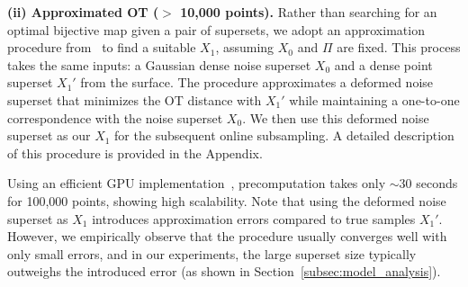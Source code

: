 \textbf{(ii) Approximated OT ($>$ 10,000 points).
}
Rather than searching for an optimal bijective map given a pair of supersets, we adopt an approximation procedure from~\cite{feydy2020geometric} to find a suitable $X_1$, assuming $X_0$ and $\Pi$ are fixed.
This process takes the same inputs: a Gaussian dense noise superset $X_0$ and a dense point superset $X_1'$ from the surface.
%
The procedure approximates a deformed noise superset that minimizes the OT distance with $X_1'$ while maintaining a one-to-one correspondence with the noise superset $X_0$.
We then use this deformed noise superset as our $X_1$ for the subsequent online subsampling.
%
%
%
%
A detailed description of this procedure is provided in the Appendix.

%
Using an efficient GPU implementation~\cite{feydy2020geometric}, precomputation takes only $\sim 30$ seconds for 100,000 points, showing high scalability.
%
%
Note that using the deformed noise superset as $X_1$ introduces approximation errors compared to true samples $X_1'$.
%
However, we empirically observe that the procedure usually converges well with only small errors, and in our experiments, the large superset size typically outweighs the introduced error (as shown in Section~\ref{subsec:model_analysis}).
%
    
